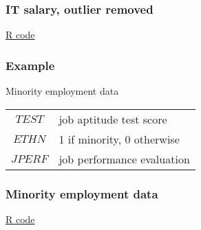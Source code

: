 \documentclass[handout]{beamer}
\begin{document}


   \begin{frame}
   \frametitle{IT salary, outlier removed}
   \begin{center}
   \end{center}
   \href{http://stats191.stanford.edu/interactions.html#salary-example}{R code}
   \end{frame}


   \begin{frame} \frametitle{Example}

   \begin{block}
   { Minority employment data                   }
   \begin{tabular}{cl}
   $TEST$ & job aptitude test score \\
   $ETHN$ & 1 if minority, 0 otherwise \\
   $JPERF$ & job performance evaluation
   \end{tabular}
   \end{block}
   \end{frame}



   \begin{frame}
   \frametitle{Minority employment data}
   \begin{center}
   \end{center}
   \href{http://stats191.stanford.edu/interactions.html#minority-employment-data}{R code}
   \end{frame}
\end{document}
